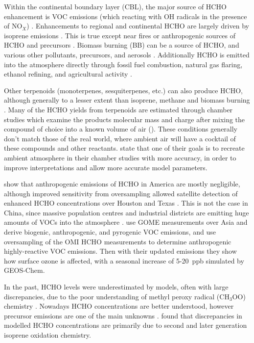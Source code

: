     Within the continental boundary layer (CBL), the major source of HCHO enhancement is VOC emissions (which reacting with OH radicals in the presence of NO$_X$) \parencite{Wagner2002, Millet2006, Kefauver2014}.
    Enhancements to regional and continental HCHO are largely driven by isoprene emissions \parencite{Guenther1995, Palmer2003, Shim2005, Kefauver2014}.
    This is true except near fires or anthropogenic sources of HCHO and precursors \parencite{Guenther1995, Kefauver2014, Wolfe2016}.
    Biomass burning (BB) can be a source of HCHO, and various other pollutants, precursors, and aerosols \parencite{Guenther1995, Andreae2001}.
    Additionally HCHO is emitted into the atmosphere directly through fossil fuel combustion, natural gas flaring, ethanol refining, and agricultural activity \parencite{Wolfe2016}.
    
    Other terpenoids (monoterpenes, sesquiterpenes, etc.) can also produce HCHO, although generally to a lesser extent than isoprene, methane and biomass burning \parencite{Guenther2012}.
    Many of the HCHO yields from terpenoids are estimated through chamber studies which examine the products molecular mass and charge after mixing the compound of choice into a known volume of air (\textcite[eg.]{Nguyen2014}).
    These conditions generally don't match those of the real world, where ambient air will have a cocktail of these compounds and other reactants.
    \textcite{Nguyen2014} state that one of their goals is to recreate ambient atmosphere in their chamber studies with more accuracy, in order to improve interpretations and allow more accurate model parameters.
    
    \textcite{Millet2008} show that anthropogenic emissions of HCHO in America are mostly negligible, although improved sensitivity from oversampling allowed satellite detection of enhanced HCHO concentrations over Houston and Texas \parencite{Zhu2014}.
    This is not the case in China, since massive population centres and industrial districts are emitting huge amounts of VOCs into the atmosphere \parencite{Fu2007}.
    \textcite{Fu2007} use GOME measurements over Asia and derive biogenic, anthropogenic, and pyrogenic VOC emissions, and \textcite{Zhu2014} use oversampling of the OMI HCHO measurements to determine anthropogenic highly-reactive VOC emissions.
    Then with their updated emissions they show how surface ozone is affected, with a seasonal increase of 5-20~ppb simulated by GEOS-Chem.
    
    In the past, HCHO levels were underestimated by models, often with large discrepancies, due to the poor understanding of methyl peroxy radical (CH$_3$OO) chemistry \parencite{Wagner2002}.
    Nowadays HCHO concentrations are better understood, however precursor emissions are one of the main unknowns \parencite[eg.]{Emmerson2016,Marvin2017}.
    \textcite{Marvin2017} found that discrepancies in modelled HCHO concentrations are primarily due to second and later generation isoprene oxidation chemistry.
    
